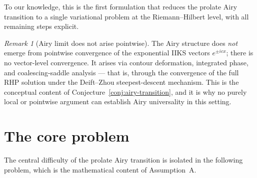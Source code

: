 \documentclass[12pt,a4paper]{amsart}
\theoremstyle{definition}
\theoremstyle{remark}
\newtheorem{remark}[theorem]{Remark}
\begin{document}
To our knowledge, this is the first formulation that reduces
the prolate Airy transition to a single variational problem
at the Riemann--Hilbert level, with all remaining steps explicit.

\begin{remark}[Airy limit does not arise pointwise]
\label{rem:not-pointwise}
The Airy structure does \emph{not} emerge from pointwise convergence of
the exponential IIKS vectors $e^{\pm icx}$; there is no vector-level
convergence.
It arises via contour deformation, integrated phase, and coalescing-saddle
analysis --- that is, through the convergence of the full RHP solution
under the Deift--Zhou steepest-descent mechanism.
This is the conceptual content of Conjecture~\ref{conj:airy-transition},
and it is why no purely local or pointwise argument can establish
Airy universality in this setting.
\end{remark}

\begin{center}
\end{center}

\section{The core problem}
\label{sec:core}

The central difficulty of the prolate Airy transition is isolated
in the following problem, which is the mathematical content of
Assumption~A.
\end{document}
